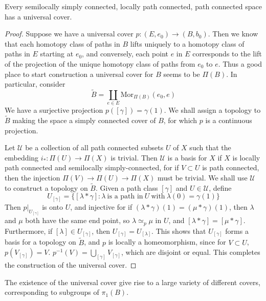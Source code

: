 \begin{theorem}
    Every semilocally simply connected, locally path connected, path connected space has a universal cover.
\end{theorem}
\begin{proof}
Suppose we have a universal cover $p: (E,e_0) \to (B,b_0)$. Then we know that each homotopy class of paths in $B$ lifts uniquely to a homotopy class of paths in $E$ starting at $e_0$, and conversely, each point $e$ in $E$ corresponds to the lift of the projection of the unique homotopy class of paths from $e_0$ to $e$. Thus a good place to start construction a universal cover for $B$ seems to be $\Pi(B)$. In particular, consider
%
\[ \tilde{B} = \coprod_{e \in E} \text{Mor}_{\Pi(B)}(e_0, e) \]
%
We have a surjective projection $p([\gamma]) = \gamma(1)$. We shall assign a topology to $\tilde{B}$ making the space a simply connected cover of $B$, for which $p$ is a continuous projection.

Let $\mathcal{U}$ be a collection of all path connected subsets $U$ of $X$ such that the embedding $i_*: \Pi(U) \to \Pi(X)$ is trivial. Then $\mathcal{U}$ is a basis for $X$ if $X$ is locally path connected and semilocally simply-connected, for if $V \subset U$ is path connected, then the injection $\Pi(V) \to \Pi(U) \to \Pi(X)$ must be trivial. We shall use $\mathcal{U}$ to construct a topology on $\tilde{B}$. Given a path class $[\gamma]$ and $U \in \mathcal{U}$, define
%
\[ U_{[\gamma]} = \{ [\lambda * \gamma] : \lambda\ \text{is a path in}\ U\ \text{with}\ \lambda(0) = \gamma(1) \} \]
%
Then $p|_{U_{[\gamma]}}$ is onto $U$, and injective for if $(\lambda * \gamma)(1) = (\mu * \gamma)(1)$, then $\lambda$ and $\mu$ both have the same end point, so $\lambda \simeq_p \mu$ in $U$, and $[\lambda * \gamma] = [\mu * \gamma]$. Furthermore, if $[\lambda] \in U_{[\gamma]}$, then $U_{[\gamma]} = U_{[\lambda]}$. This shows that $U_{[\gamma]}$ forms a basis for a topology on $\tilde{B}$, and $p$ is locally a homeomorphism, since for $V \subset U$, $p(V_{[\gamma]}) = V$. $p^{-1}(V) = \bigcup_{[\gamma]} V_{[\gamma]}$, which are disjoint or equal. This completes the construction of the universal cover.
\end{proof}

The existence of the universal cover give rise to a large variety of different covers, corresponding to subgroups of $\pi_1(B)$.

